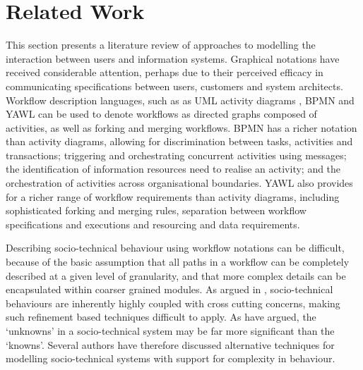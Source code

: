 \documentclass{llncs}
\begin{document}

\section{Related Work}
\label{sec:related}


This section presents a literature review of approaches to modelling the interaction between users and information
systems.  Graphical notations have received considerable attention, perhaps due to their perceived efficacy in
communicating specifications between users, customers and system architects.  Workflow description languages, such as as
UML activity diagrams \citep{omg07omguml}, BPMN \citep{omg2011omgbpmn} and YAWL \citep{hofstede2010yawl} can be used to
denote workflows as directed graphs composed of activities, as well as forking and merging workflows.  BPMN has a richer
notation than activity diagrams, allowing for discrimination between tasks, activities and transactions; triggering and
orchestrating concurrent activities using messages; the identification of information resources need to realise an
activity; and the orchestration of activities across organisational boundaries. YAWL also provides for a richer range of
workflow requirements than activity diagrams, including sophisticated forking and merging rules, separation between
workflow specifications and executions and resourcing and data requirements.

Describing socio-technical behaviour using workflow notations can be difficult, because of the basic assumption that all
paths in a workflow can be completely described at a given level of granularity, and that more complex details can be
encapsulated within coarser grained modules.  As argued in , socio-technical behaviours are
inherently highly coupled with cross cutting concerns, making such refinement based techniques difficult to apply.  As
\citet{israilidis13ignorance} have argued, the `unknowns' in a socio-technical system may be far more significant than
the `knowns'. Several authors have therefore discussed alternative techniques for modelling socio-technical systems with
support for complexity in behaviour.
\end{document}
